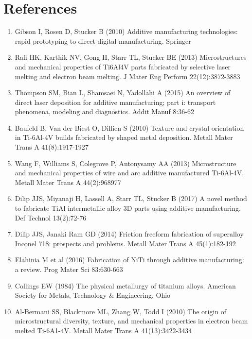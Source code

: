 \documentclass[10pt]{article}
\begin{document}
\section*{References}
\begin{enumerate}
  \item Gibson I, Rosen D, Stucker B (2010) Additive manufacturing technologies: rapid prototyping to direct digital manufacturing. Springer

  \item Rafi HK, Karthik NV, Gong H, Starr TL, Stucker BE (2013) Microstructures and mechanical properties of Ti6Al4V parts fabricated by selective laser melting and electron beam melting. J Mater Eng Perform 22(12):3872-3883

  \item Thompson SM, Bian L, Shamsaei N, Yadollahi A (2015) An overview of direct laser deposition for additive manufacturing; part i: transport phenomena, modeling and diagnostics. Addit Manuf 8:36-62

  \item Baufeld B, Van der Biest O, Dillien S (2010) Texture and crystal orientation in Ti-6Al-4V builds fabricated by shaped metal deposition. Metall Mater Trans A 41(8):1917-1927

  \item Wang F, Williams S, Colegrove P, Antonysamy AA (2013) Microstructure and mechanical properties of wire and arc additive manufactured Ti-6Al-4V. Metall Mater Trans A 44(2):968977

  \item Dilip JJS, Miyanaji H, Lassell A, Starr TL, Stucker B (2017) A novel method to fabricate TiAl intermetallic alloy 3D parts using additive manufacturing. Def Technol 13(2):72-76

  \item Dilip JJS, Janaki Ram GD (2014) Friction freeform fabrication of superalloy Inconel 718: prospects and problems. Metall Mater Trans A 45(1):182-192

  \item Elahinia M et al (2016) Fabrication of NiTi through additive manufacturing: a review. Prog Mater Sci 83:630-663

  \item Collings EW (1984) The physical metallurgy of titanium alloys. American Society for Metals, Technology \& Engineering, Ohio

  \item Al-Bermani SS, Blackmore ML, Zhang W, Todd I (2010) The origin of microstructural diversity, texture, and mechanical properties in electron beam melted Ti-6A1-4V. Metall Mater Trans A 41(13):3422-3434


\end{enumerate}
\end{document}
